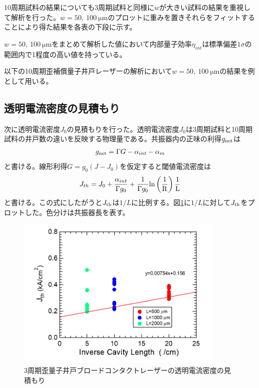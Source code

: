 {10周期試料の結果についても3周期試料と同様に$w$が大きい試料の結果を重視して解析を行った。$w=50, \ 100\ \si{\micro\metre}$のプロットに重みを置きそれらをフィットすることにより得た結果を各表の下段に示す。

$w=50, \ 100\ \si{\micro\metre}$をまとめて解析した値において内部量子効率$\eta_{int}$は標準偏差$1\sigma$の範囲内で1程度の高い値を持っている。


以下の10周期歪補償量子井戸レーザーの解析において$w=50, \ 100\ \si{ \micro\metre}$の結果を例として用いる。

\clearpage
\subsection{透明電流密度の見積もり}

次に透明電流密度$J_{0}$の見積もりを行った。透明電流密度$J_{0}$は3周期試料と10周期試料の井戸数の違いを反映する物理量である。共振器内の正味の利得$g_{\rm{net}}$は
\begin{eqnarray}
g_{\rm{net}}=\Gamma G-\alpha_{int}-\alpha_{m}
\label{eq:eta_j0}
\end{eqnarray}
と書ける。線形利得$G=g_{0}(J-J_{0})$を仮定すると閾値電流密度は
\begin{eqnarray}
J_{th}=J_{0}+\dfrac{\alpha_{int}}{\Gamma g_{0}}+\dfrac{1}{\Gamma g_{0}}\rm{ln}\left(\dfrac{1}{R}\right)\dfrac{1}{L}
\label{eq:j_th}
\end{eqnarray}
と書ける。この式にしたがうと$J_{\rm{th}}$は$1/L$に比例する。図\ref{fig:fig_3_1_3QW_broadcontact_j0}に$1/L$に対して$J_{\rm{th}}$をプロットした。色分けは共振器長を表す。
\begin{figure}[h]
	\centering
	\includegraphics[width=10cm]{figure/fig_3_1_3QW_broadcontact_j0.png}
	\caption{3周期歪量子井戸ブロードコンタクトレーザーの透明電流密度の見積もり}
	\label{fig:fig_3_1_3QW_broadcontact_j0}
\end{figure}

}
